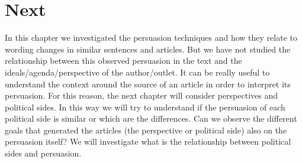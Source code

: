 
\section{\statusgreen Next}
In this chapter we investigated the persuasion techniques and how they relate to wording changes in similar sentences and articles.
But we have not studied the relationship between this observed persuasion in the text and the ideals/agenda/perspective of the author/outlet.
It can be really useful to understand the context around the source of an article in order to interpret its persuasion.
For this reason, the next chapter will consider perspectives and political sides.
In this way we will try to understand if the persuasion of each political side is similar or which are the differences.
Can we observe the different goals that generated the articles (the perspective or political side) also on the persuasion itself? We will investigate what is the relationship between political sides and persuasion.
